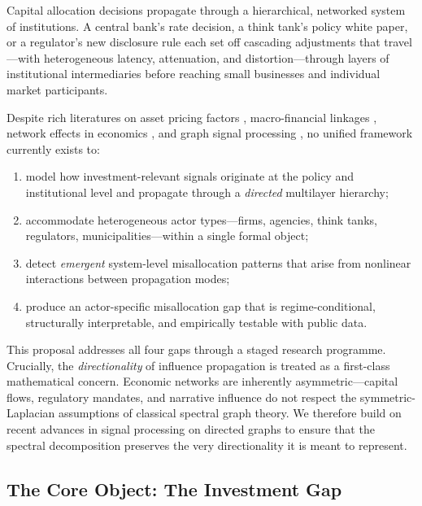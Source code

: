 \documentclass[11pt,a4paper]{article}
\theoremstyle{definition}
\begin{document}
Capital allocation decisions propagate through a hierarchical, networked system of institutions. A central bank's rate decision, a think tank's policy white paper, or a regulator's new disclosure rule each set off cascading adjustments that travel---with heterogeneous latency, attenuation, and distortion---through layers of institutional intermediaries before reaching small businesses and individual market participants.

Despite rich literatures on asset pricing factors \citep{fama1993common}, macro-financial linkages \citep{bernanke1999monetary}, network effects in economics \citep{acemoglu2012network,elliott2014financial}, and graph signal processing \citep{ortega2018graph}, no unified framework currently exists to:
\begin{enumerate}[label=(\roman*),nosep]
  \item model how investment-relevant signals originate at the policy and institutional level and propagate through a \emph{directed} multilayer hierarchy;
  \item accommodate heterogeneous actor types---firms, agencies, think tanks, regulators, municipalities---within a single formal object;
  \item detect \emph{emergent} system-level misallocation patterns that arise from nonlinear interactions between propagation modes;
  \item produce an actor-specific misallocation gap that is regime-conditional, structurally interpretable, and empirically testable with public data.
\end{enumerate}

This proposal addresses all four gaps through a staged research programme. Crucially, the \emph{directionality} of influence propagation is treated as a first-class mathematical concern. Economic networks are inherently asymmetric---capital flows, regulatory mandates, and narrative influence do not respect the symmetric-Laplacian assumptions of classical spectral graph theory. We therefore build on recent advances in signal processing on directed graphs \citep{marques2020signal,sandryhaila2013discrete,kwak2024polar} to ensure that the spectral decomposition preserves the very directionality it is meant to represent.

\subsection{The Core Object: The Investment Gap}
\end{document}
